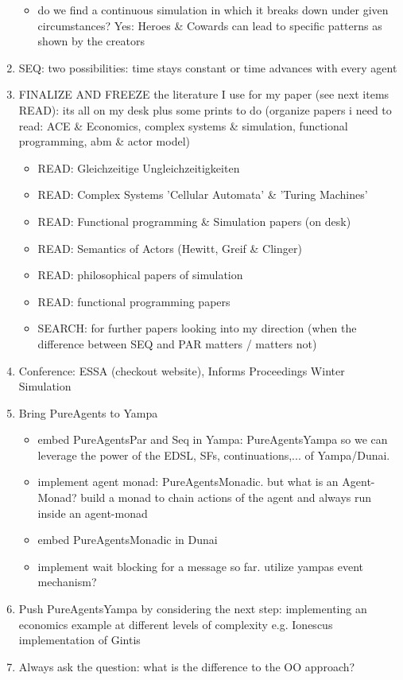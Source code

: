 \begin{enumerate}
\begin{itemize}
		\item do we find a continuous simulation in which it breaks down under given circumstances? Yes: Heroes \& Cowards can lead to specific patterns as shown by the creators
	\end{itemize}
	
\item SEQ: two possibilities: time stays constant or time advances with every agent

\item FINALIZE AND FREEZE the literature I use for my paper (see next items READ): its all on my desk plus some prints to do (organize papers i need to read: ACE \& Economics, complex systems \& simulation, functional programming, abm \& actor model)
	\begin{itemize}
		\item READ: Gleichzeitige Ungleichzeitigkeiten
		\item READ: Complex Systems 'Cellular Automata' \& 'Turing Machines'
		\item READ: Functional programming \& Simulation papers (on desk)
		\item READ: Semantics of Actors (Hewitt, Greif \& Clinger)
		\item READ: philosophical papers of simulation
		\item READ: functional programming papers
		\item SEARCH: for further papers looking into my direction (when the difference between SEQ and PAR matters / matters not)
	\end{itemize}

\item Conference: ESSA (checkout website), Informs Proceedings Winter Simulation

\item Bring PureAgents to Yampa
	\begin{itemize}
		\item embed PureAgentsPar and Seq in Yampa: PureAgentsYampa so we can leverage the power of the EDSL, SFs, continuations,... of Yampa/Dunai.
		\item implement agent monad: PureAgentsMonadic. but what is an Agent-Monad? build a monad to chain actions of the agent and always run inside an agent-monad
		\item embed PureAgentsMonadic in Dunai
		\item implement wait blocking for a message so far. utilize yampas event mechanism?
	\end{itemize}
	
\item Push PureAgentsYampa by considering the next step: implementing an economics example at different levels of complexity e.g. Ionescus implementation of Gintis

\item Always ask the question: what is the difference to the OO approach? 
\end{enumerate} 


